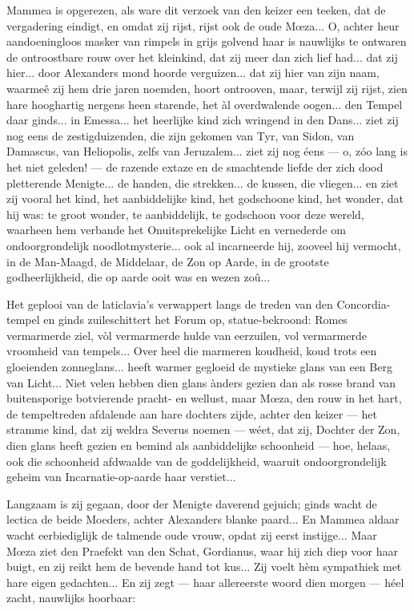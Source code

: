\documentclass[a4paper, 12pt, oneside, dutch]{article}
\begin{document}
Mammea is opgerezen, als ware dit verzoek van den keizer een teeken, dat de vergadering eindigt, en omdat zij rijst, rijst ook de oude Mœza... O, achter heur aandoeningloos masker van rimpels in grijs golvend haar is nauwlijks te ontwaren de ontroostbare rouw over het kleinkind, dat zij meer dan zich lief had... dat zij hier... door Alexanders mond hoorde verguizen... dat zij hier van zijn naam, waarmeê zij hem drie jaren noemden, hoort ontrooven, maar, terwijl zij rijst, zien hare hooghartig nergens heen starende, het àl overdwalende oogen... den Tempel daar ginds... in Emessa... het heerlijke kind zich wringend in den Dans... ziet zij nog eens de zestigduizenden, die zijn gekomen van Tyr, van Sidon, van Damascus, van Heliopolis, zelfs van Jeruzalem... ziet zij nog éens --- o, zóo lang is het niet geleden! --- de razende extaze en de smachtende liefde der zich dood pletterende Menigte... de handen, die strekken... de kussen, die vliegen... en ziet zij vooral het kind, het aanbiddelijke kind, het godschoone kind, het wonder, dat hij was: te groot wonder, te aanbiddelijk, te godschoon voor deze wereld, waarheen hem verbande het Onuitsprekelijke Licht en vernederde om ondoorgrondelijk noodlotmysterie... ook al incarneerde hij, zooveel hij vermocht, in de Man-Maagd, de Middelaar, de Zon op Aarde, in de grootste godheerlijkheid, die op aarde ooit was en wezen zoû...

Het geplooi van de laticlavia's verwappert langs de treden van den Concordia-tempel en ginds zuileschittert het Forum op, statue-bekroond: Romes vermarmerde ziel, vòl vermarmerde hulde van eerzuilen, vol vermarmerde vroomheid van tempels... Over heel die marmeren koudheid, koud trots een gloeienden zonneglans... heeft warmer gegloeid de mystieke glans van een Berg van Licht... Niet velen hebben dien glans ànders gezien dan als rosse brand van buitensporige botvierende pracht- en wellust, maar Mœza, den rouw in het hart, de tempeltreden afdalende aan hare dochters zijde, achter den keizer --- het stramme kind, dat zij weldra Severus noemen --- wéet, dat zij, Dochter der Zon, dien glans heeft gezien en bemind als aanbiddelijke schoonheid --- hoe, helaas, ook die schoonheid afdwaalde van de goddelijkheid, waaruit ondoorgrondelijk geheim van Incarnatie-op-aarde haar verstiet...

Langzaam is zij gegaan, door der Menigte daverend gejuich; ginds wacht de lectica de beide Moeders, achter Alexanders blanke paard... En Mammea aldaar wacht eerbiediglijk de talmende oude vrouw, opdat zij eerst instijge... Maar Mœza ziet den Praefekt van den Schat, Gordianus, waar hij zich diep voor haar buigt, en zij reikt hem de bevende hand tot kus... Zij voelt hèm sympathiek met hare eigen gedachten... En zij zegt --- haar allereerste woord dien morgen --- héel zacht, nauwlijks hoorbaar:
\end{document}
